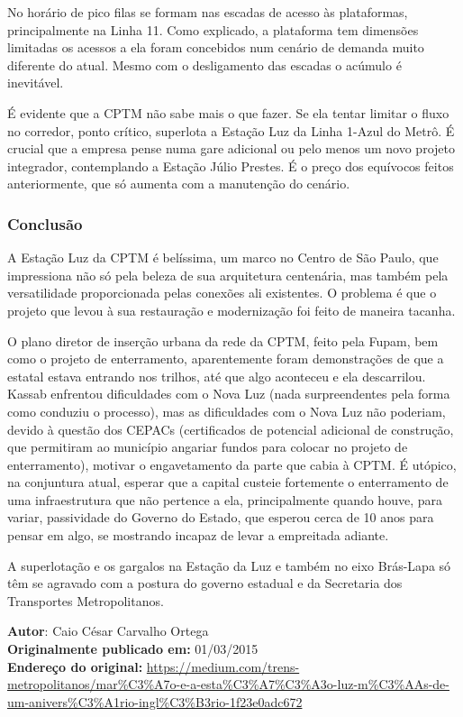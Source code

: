 \documentclass[11pt,fleqn]{book} %
\begin{document}
No horário de pico filas se formam nas escadas de acesso às plataformas, principalmente na Linha 11. Como explicado, a plataforma tem dimensões limitadas os acessos a ela foram concebidos num cenário de demanda muito diferente do atual. Mesmo com o desligamento das escadas o acúmulo é inevitável.

É evidente que a CPTM não sabe mais o que fazer. Se ela tentar limitar o fluxo no corredor, ponto crítico, superlota a Estação Luz da Linha 1-Azul do Metrô. É crucial que a empresa pense numa gare adicional ou pelo menos um novo projeto integrador, contemplando a Estação Júlio Prestes. É o preço dos equívocos feitos anteriormente, que só aumenta com a manutenção do cenário.

\subsubsection{Conclusão}

A Estação Luz da CPTM é belíssima, um marco no Centro de São Paulo, que impressiona não só pela beleza de sua arquitetura centenária, mas também pela versatilidade proporcionada pelas conexões ali existentes. O problema é que o projeto que levou à sua restauração e modernização foi feito de maneira tacanha.

O plano diretor de inserção urbana da rede da CPTM, feito pela Fupam, bem como o projeto de enterramento, aparentemente foram demonstrações de que a estatal estava entrando nos trilhos, até que algo aconteceu e ela descarrilou. Kassab enfrentou dificuldades com o Nova Luz (nada surpreendentes pela forma como conduziu o processo), mas as dificuldades com o Nova Luz não poderiam, devido à questão dos CEPACs (certificados de potencial adicional de construção, que permitiram ao município angariar fundos para colocar no projeto de enterramento), motivar o engavetamento da parte que cabia à CPTM. É utópico, na conjuntura atual, esperar que a capital custeie fortemente o enterramento de uma infraestrutura que não pertence a ela, principalmente quando houve, para variar, passividade do Governo do Estado, que esperou cerca de 10 anos para pensar em algo, se mostrando incapaz de levar a empreitada adiante.

A superlotação e os gargalos na Estação da Luz \textemdash e também no eixo Brás-Lapa \textemdash só têm se agravado com a postura do governo estadual e da Secretaria dos Transportes Metropolitanos.

\begin{info}
	\textbf{Autor}: Caio César Carvalho Ortega \\
	\textbf{Originalmente publicado em:} 01/03/2015 \\
	\textbf{Endereço do original:} \url{https://medium.com/trens-metropolitanos/mar%C3%A7o-e-a-esta%C3%A7%C3%A3o-luz-m%C3%AAs-de-um-anivers%C3%A1rio-ingl%C3%B3rio-1f23e0adc672}
\end{info}
\end{document}
